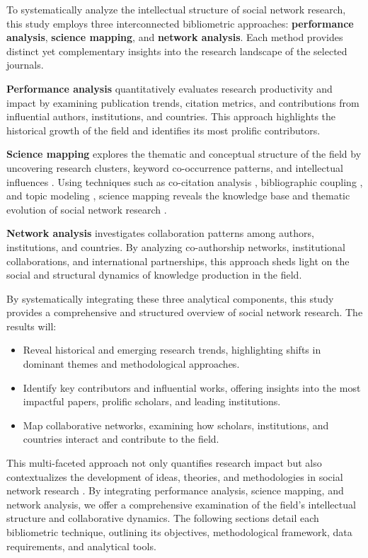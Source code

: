\documentclass[twocolumn]{article}
\begin{document}
	To systematically analyze the intellectual structure of social network research, this study employs three interconnected bibliometric approaches: \textbf{performance analysis}, \textbf{science mapping}, and \textbf{network analysis}.\cite{donthu2021bibliometric} Each method provides distinct yet complementary insights into the research landscape of the selected journals.
	
	\textbf{Performance analysis} quantitatively evaluates research productivity and impact by examining publication trends, citation metrics, and contributions from influential authors, institutions, and countries\cite{ WOS:000331771900008}. This approach highlights the historical growth of the field and identifies its most prolific contributors.
	
	\textbf{Science mapping} explores the thematic and conceptual structure of the field by uncovering research clusters, keyword co-occurrence patterns, and intellectual influences \cite{Small1973, Callon1991, Borner2003}. Using techniques such as co-citation analysis \cite{Small1973}, bibliographic coupling \cite{Kessler1963}, and topic modeling \cite{Blei2003}, science mapping reveals the knowledge base and thematic evolution of social network research \cite{Chen2006, Cobo2011}.
	
	\textbf{Network analysis} investigates collaboration patterns among authors, institutions, and countries. By analyzing co-authorship networks, institutional collaborations, and international partnerships, this approach sheds light on the social and structural dynamics of knowledge production in the field\cite{ WOS:000336729500129}.
	
	By systematically integrating these three analytical components, this study provides a comprehensive and structured overview of social network research\cite{donthu2021bibliometric,yazdanjue_comprehensive_2023}. The results will:
	\begin{itemize}
		\item Reveal historical and emerging research trends, highlighting shifts in dominant themes and methodological approaches.
		\item Identify key contributors and influential works, offering insights into the most impactful papers, prolific scholars, and leading institutions.
		\item Map collaborative networks, examining how scholars, institutions, and countries interact and contribute to the field.
	\end{itemize}
	This multi-faceted approach not only quantifies research impact but also contextualizes the development of ideas, theories, and methodologies in social network research \cite{Small1973, Callon1991,Cobo2011}. By integrating performance analysis, science mapping, and network analysis, we offer a comprehensive examination of the field’s intellectual structure and collaborative dynamics. The following sections detail each bibliometric technique, outlining its objectives, methodological framework, data requirements, and analytical tools.
	
\end{document}
